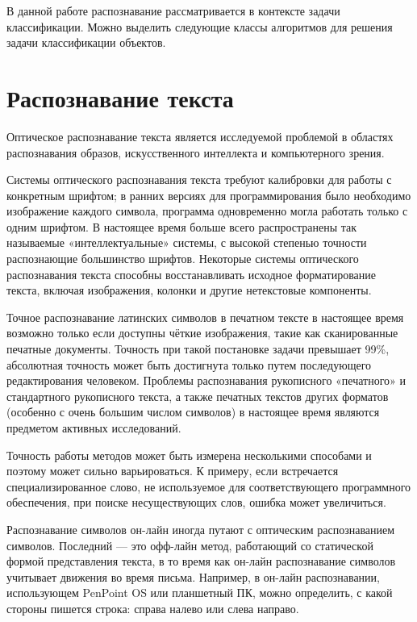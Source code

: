 В данной работе распознавание рассматривается в контексте задачи классификации. Можно выделить следующие классы алгоритмов для решения задачи классификации объектов.

\section{Распознавание текста}
Оптическое распознавание текста является исследуемой проблемой в областях распознавания образов, искусственного интеллекта и компьютерного зрения.

Системы оптического распознавания текста требуют калибровки для работы с конкретным шрифтом; в ранних версиях для программирования было необходимо изображение каждого символа, программа одновременно могла работать только с одним шрифтом. В настоящее время больше всего распространены так называемые «интеллектуальные» системы, с высокой степенью точности распознающие большинство шрифтов. Некоторые системы оптического распознавания текста способны восстанавливать исходное форматирование текста, включая изображения, колонки и другие нетекстовые компоненты.

Точное распознавание латинских символов в печатном тексте в настоящее время возможно только если доступны чёткие изображения, такие как сканированные печатные документы. Точность при такой постановке задачи превышает 99\%, абсолютная точность может быть достигнута только путем последующего редактирования человеком. Проблемы распознавания рукописного «печатного» и стандартного рукописного текста, а также печатных текстов других форматов (особенно с очень большим числом символов) в настоящее время являются предметом активных исследований.

Точность работы методов может быть измерена несколькими способами и поэтому может сильно варьироваться. К примеру, если встречается специализированное слово, не используемое для соответствующего программного обеспечения, при поиске несуществующих слов, ошибка может увеличиться.

Распознавание символов он-лайн иногда путают с оптическим распознаванием символов. Последний — это офф-лайн метод, работающий со статической формой представления текста, в то время как он-лайн распознавание символов учитывает движения во время письма. Например, в он-лайн распознавании, использующем PenPoint OS или планшетный ПК, можно определить, с какой стороны пишется строка: справа налево или слева направо.

